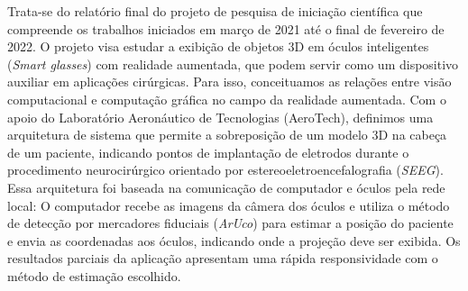 \documentclass[Portugues]{projetoFAPESP}
\begin{document}

\geraTitulo

\folhaDeRosto

\begin{resumo}

Trata-se do relatório final do projeto de pesquisa de iniciação científica que compreende os trabalhos iniciados em março de 2021 até o final de fevereiro de 2022. O projeto visa estudar a exibição de objetos 3D em óculos inteligentes (\textit{Smart glasses}) com realidade aumentada, que podem servir como um dispositivo auxiliar em aplicações cirúrgicas. Para isso, conceituamos as relações entre visão computacional e computação gráfica no campo da realidade aumentada. Com o apoio do Laboratório Aeronáutico de Tecnologias (AeroTech), definimos uma arquitetura de sistema que permite a sobreposição de um modelo 3D na cabeça de um paciente, indicando pontos de implantação de eletrodos durante o procedimento neurocirúrgico orientado por estereoeletroencefalografia (\textit{SEEG}). Essa arquitetura foi baseada na comunicação de computador e óculos pela rede local: O computador recebe as imagens da câmera dos óculos e utiliza o método de detecção por mercadores fiduciais (\textit{ArUco}) para estimar a posição do paciente e envia as coordenadas aos óculos, indicando onde a projeção deve ser exibida. Os resultados parciais da aplicação apresentam uma rápida responsividade com o método de estimação escolhido.

  
\end{resumo}

\clearpage
\tableofcontents
\thispagestyle{empty}
\clearpage










\printbibliography[heading=bibintoc, title={Referências bibliográficas} ]
\end{document}
